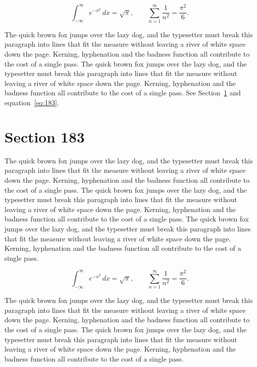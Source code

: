 \documentclass{article}
\begin{document}
\begin{equation}\label{eq:182}
\int_{-\infty}^{\infty} e^{-x^{2}}\,dx = \sqrt{\pi}, \qquad
\sum_{n=1}^{\infty} \frac{1}{n^{2}} = \frac{\pi^{2}}{6}.
\end{equation}

The quick brown fox jumps over the lazy dog, and the typesetter must break this paragraph into lines that fit the measure without leaving a river of white space down the page. Kerning, hyphenation and the badness function all contribute to the cost of a single pass. The quick brown fox jumps over the lazy dog, and the typesetter must break this paragraph into lines that fit the measure without leaving a river of white space down the page. Kerning, hyphenation and the badness function all contribute to the cost of a single pass. 
See Section~\ref{sec:183} and equation~\eqref{eq:183}.
\section{Section 183}
\label{sec:183}
The quick brown fox jumps over the lazy dog, and the typesetter must break this paragraph into lines that fit the measure without leaving a river of white space down the page. Kerning, hyphenation and the badness function all contribute to the cost of a single pass. The quick brown fox jumps over the lazy dog, and the typesetter must break this paragraph into lines that fit the measure without leaving a river of white space down the page. Kerning, hyphenation and the badness function all contribute to the cost of a single pass. The quick brown fox jumps over the lazy dog, and the typesetter must break this paragraph into lines that fit the measure without leaving a river of white space down the page. Kerning, hyphenation and the badness function all contribute to the cost of a single pass. 

\begin{equation}\label{eq:183}
\int_{-\infty}^{\infty} e^{-x^{2}}\,dx = \sqrt{\pi}, \qquad
\sum_{n=1}^{\infty} \frac{1}{n^{2}} = \frac{\pi^{2}}{6}.
\end{equation}

The quick brown fox jumps over the lazy dog, and the typesetter must break this paragraph into lines that fit the measure without leaving a river of white space down the page. Kerning, hyphenation and the badness function all contribute to the cost of a single pass. The quick brown fox jumps over the lazy dog, and the typesetter must break this paragraph into lines that fit the measure without leaving a river of white space down the page. Kerning, hyphenation and the badness function all contribute to the cost of a single pass. 
\end{document}
